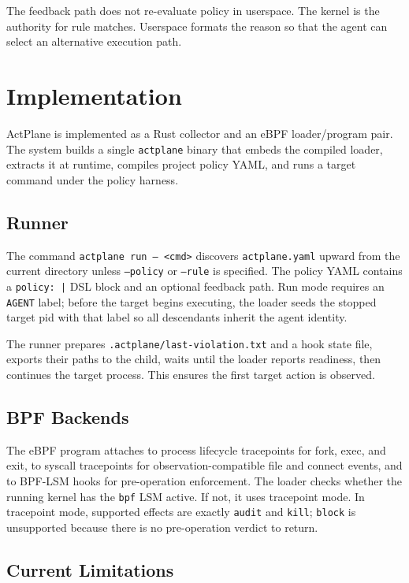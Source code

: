 The feedback path does not re-evaluate policy in userspace. The kernel is the
authority for rule matches. Userspace formats the reason so that the agent can select an
alternative execution path.


\section{Implementation}

ActPlane is implemented as a Rust collector and an eBPF loader/program pair.
The system builds a single \texttt{actplane} binary that embeds the
compiled loader, extracts it at runtime, compiles project policy YAML, and runs
a target command under the policy harness.

\subsection{Runner}

The command \texttt{actplane run -- <cmd>} discovers \texttt{actplane.yaml}
upward from the current directory unless \texttt{--policy} or \texttt{--rule} is
specified. The policy YAML contains a \texttt{policy: |} DSL block and an
optional feedback path. Run mode requires an \texttt{AGENT} label; before the
target begins executing, the loader seeds the stopped target pid with that label
so all descendants inherit the agent identity.

The runner prepares \texttt{.actplane/last-violation.txt} and a hook state file,
exports their paths to the child, waits until the loader reports readiness, then
continues the target process. This ensures the first target action is observed.

\subsection{BPF Backends}

The eBPF program attaches to process lifecycle tracepoints for fork, exec, and
exit, to syscall tracepoints for observation-compatible file and connect events,
and to BPF-LSM hooks for pre-operation enforcement. The loader checks whether
the running kernel has the \texttt{bpf} LSM active. If not, it uses tracepoint
mode. In tracepoint mode, supported effects are exactly \texttt{audit} and
\texttt{kill}; \texttt{block} is unsupported because there is no pre-operation
verdict to return.

\subsection{Current Limitations}

